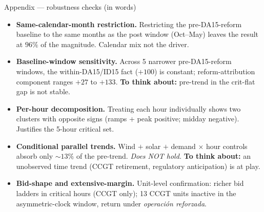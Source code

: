 \documentclass[10pt,aspectratio=169]{beamer}
\begin{document}
\begin{frame}{Appendix --- robustness checks (in words)}
  \footnotesize
  \begin{itemize}
    \item \textbf{Same-calendar-month restriction.} Restricting the pre-DA15-reform baseline to the same months as the post window (Oct--May) leaves the result at $96\%$ of the magnitude. Calendar mix not the driver.
    \item \textbf{Baseline-window sensitivity.} Across 5 narrower pre-DA15-reform windows, the within-DA15/ID15 fact ($+100$) is constant; reform-attribution component ranges $+27$ to $+133$. \textbf{To think about:} pre-trend in the crit-flat gap is not stable.
    \item \textbf{Per-hour decomposition.} Treating each hour individually shows two clusters with opposite signs (ramps + peak positive; midday negative). Justifies the 5-hour critical set.
    \item \textbf{Conditional parallel trends.} Wind $+$ solar $+$ demand $\times$ hour controls absorb only $\sim 13\%$ of the pre-trend. \emph{Does NOT hold.} \textbf{To think about:} an unobserved time trend (CCGT retirement, regulatory anticipation) is at play.
    \item \textbf{Bid-shape and extensive-margin.} Unit-level confirmation: richer bid ladders in critical hours (CCGT only); 13 CCGT units inactive in the asymmetric-clock window, return under \emph{operación reforzada}.
  \end{itemize}
\end{frame}
\end{document}
